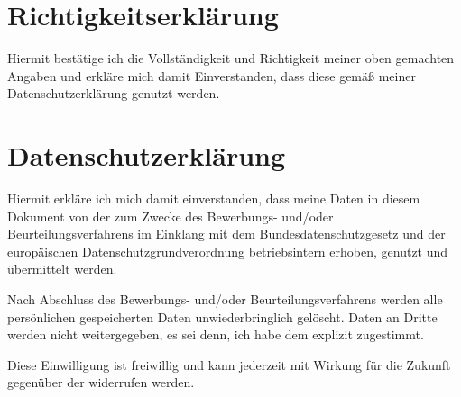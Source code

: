 \documentclass[
	a4paper,
	fontsize=12
]{scrartcl}
\begin{document}
\newcommand{\RemainingPageHeight}{\dimexpr\pagegoal-\pagetotal-\baselineskip\relax}

\newcommand{\PageFillImage}[1]{%
	\begin{minipage}[b]{\textwidth}
		\center\fcolorbox{RoyalBlue}{white}{
			\texttt{[image: \\CVDataPath/\#1]}
		}
	\end{minipage}
	\newpage
}%

\CVDocs

\section{Richtigkeitserklärung}
Hiermit bestätige ich die Vollständigkeit und Richtigkeit meiner oben
gemachten Angaben und erkläre mich damit Einverstanden, dass diese
gemäß meiner Datenschutzerklärung genutzt werden.

\section{Datenschutzerklärung}
Hiermit erkläre ich mich damit einverstanden, dass meine Daten in diesem
Dokument von der \RecpCompany{} zum Zwecke des Bewerbungs- und/oder
Beurteilungsverfahrens im Einklang mit dem Bundesdatenschutzgesetz und der
europäischen Datenschutzgrundverordnung betriebsintern erhoben, genutzt und
übermittelt werden.

Nach Abschluss des Bewerbungs- und/oder Beurteilungsverfahrens werden alle
persönlichen gespeicherten Daten unwiederbringlich gelöscht.
Daten an Dritte werden nicht weitergegeben, es sei denn, ich habe dem
explizit zugestimmt.

Diese Einwilligung ist freiwillig und kann jederzeit
mit Wirkung für die Zukunft gegenüber der \RecpCompany{} widerrufen werden.

\vfill
\MySignature
\vfill\vfill\vfill
\end{document}
